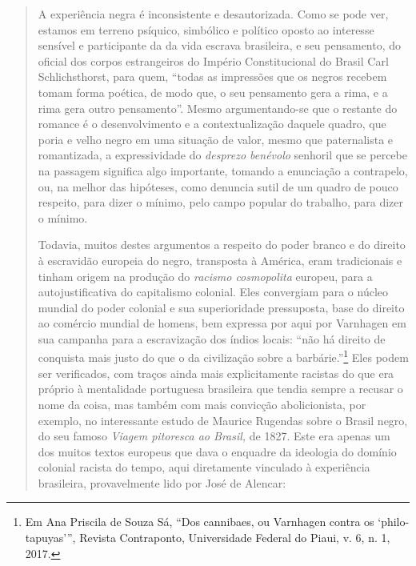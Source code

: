 \begin{quote}
A experiência negra é inconsistente e desautorizada. Como se pode ver,
estamos em terreno psíquico, simbólico e político oposto ao interesse
sensível e participante da da vida escrava brasileira, e seu pensamento,
do oficial dos corpos estrangeiros do Império Constitucional do Brasil
Carl Schlichsthorst, para quem, ``todas as impressões que os negros
recebem tomam forma poética, de modo que, o seu pensamento gera a rima,
e a rima gera outro pensamento''. Mesmo argumentando-se que o restante
do romance é o desenvolvimento e a contextualização daquele quadro, que
poria e velho negro em uma situação de valor, mesmo que paternalista e
romantizada, a expressividade do \emph{desprezo benévolo} senhoril que
se percebe na passagem significa algo importante, tomando a enunciação a
contrapelo, ou, na melhor das hipóteses, como denuncia sutil de um
quadro de pouco respeito, para dizer o mínimo, pelo campo popular do
trabalho, para dizer o mínimo.

Todavia, muitos destes argumentos a respeito do poder branco e do
direito à escravidão europeia do negro, transposta à América, eram
tradicionais e tinham origem na produção do \emph{racismo cosmopolita}
europeu, para a autojustificativa do capitalismo colonial. Eles
convergiam para o núcleo mundial do poder colonial e sua superioridade
pressuposta, base do direito ao comércio mundial de homens, bem expressa
por aqui por Varnhagen em sua campanha para a escravização dos índios
locais: ``não há direito de conquista mais justo do que o da civilização
sobre a barbárie.''\footnote{Em Ana Priscila de Souza Sá, ``Dos
  cannibaes, ou Varnhagen contra os `philo-tapuyas''', Revista
  Contraponto, Universidade Federal do Piaui, v. 6, n. 1, 2017.} Eles
podem ser verificados, com traços ainda mais explicitamente racistas do
que era próprio à mentalidade portuguesa brasileira que tendia sempre a
recusar o nome da coisa, mas também com mais convicção abolicionista,
por exemplo, no interessante estudo de Maurice Rugendas sobre o Brasil
negro, do seu famoso \emph{Viagem pitoresca ao Brasil,} de 1827. Este
era apenas um dos muitos textos europeus que dava o enquadre da
ideologia do domínio colonial racista do tempo, aqui diretamente
vinculado à experiência brasileira, provavelmente lido por José de
Alencar:


\end{quote}
